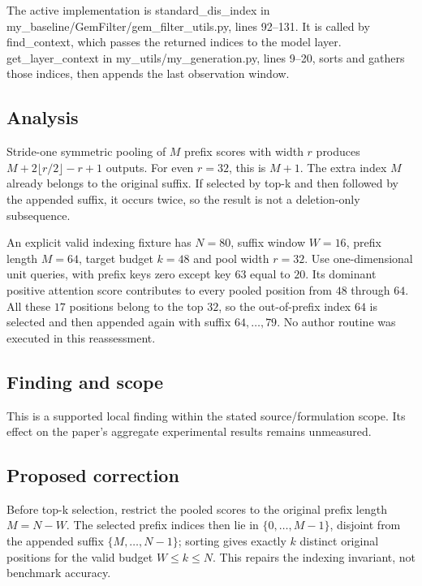 \documentclass[11pt]{article}
\begin{document}
The active implementation is standard\_dis\_index in my\_baseline/GemFilter/gem\_filter\_utils.py, lines 92–131. It is called by find\_context, which passes the returned indices to the model layer. get\_layer\_context in my\_utils/my\_generation.py, lines 9–20, sorts and gathers those indices, then appends the last observation window.

\subsection*{Analysis}

Stride-one symmetric pooling of \(M\) prefix scores with width \(r\) produces \(M+2\lfloor r/2\rfloor-r+1\) outputs. For even \(r=32\), this is \(M+1\). The extra index \(M\) already belongs to the original suffix. If selected by top-k and then followed by the appended suffix, it occurs twice, so the result is not a deletion-only subsequence.

An explicit valid indexing fixture has \(N=80\), suffix window \(W=16\), prefix length \(M=64\), target budget \(k=48\) and pool width \(r=32\). Use one-dimensional unit queries, with prefix keys zero except key \(63\) equal to \(20\). Its dominant positive attention score contributes to every pooled position from \(48\) through \(64\). All these \(17\) positions belong to the top \(32\), so the out-of-prefix index \(64\) is selected and then appended again with suffix \(64,\ldots,79\). No author routine was executed in this reassessment.

\subsection*{Finding and scope}

This is a supported local finding within the stated source/formulation scope. Its effect on the paper's aggregate experimental results remains unmeasured.

\subsection*{Proposed correction}

Before top-k selection, restrict the pooled scores to the original prefix length \(M=N-W\). The selected prefix indices then lie in \(\{0,\ldots,M-1\}\), disjoint from the appended suffix \(\{M,\ldots,N-1\}\); sorting gives exactly \(k\) distinct original positions for the valid budget \(W\leq k\leq N\). This repairs the indexing invariant, not benchmark accuracy.
\end{document}
